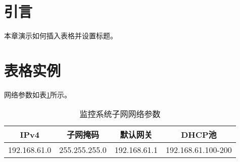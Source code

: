 

\section{引言}

本章演示如何插入表格并设置标题。

\section{表格实例}

网络参数如表\ref{tab:cctv:netconfig}所示。

\begin{table}[h]
    \centering
    \caption{监控系统子网网络参数}
    \begin{tabular}{c|c|c|c}
        \hline
        IPv4    & 子网掩码  & 默认网关  & DHCP池    \\
        \hline
        192.168.61.0 & 255.255.255.0 & 192.168.61.1 & 192.168.61.100-200 \\
        \hline
    \end{tabular}
    \label{tab:cctv:netconfig}
\end{table}
